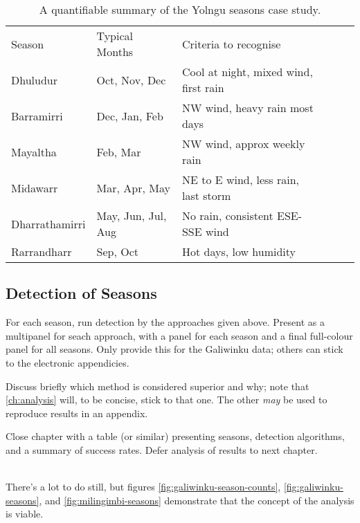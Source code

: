 \begin{table}[h]
    \centering
    \begin{tabular}{llllll}
        Season          &  Typical Months       &  Criteria to recognise                    \\
        Dhuludur        &  Oct, Nov, Dec        &  Cool at night, mixed wind, first rain    \\
        Barramirri      &  Dec, Jan, Feb        &  NW wind, heavy rain most days            \\
        Mayaltha        &  Feb, Mar             &  NW wind, approx weekly rain              \\
        Midawarr        &  Mar, Apr, May        &  NE to E wind, less rain, last storm      \\
        Dharrathamirri  &  May, Jun, Jul, Aug   &  No rain, consistent ESE-SSE wind         \\
        Rarrandharr     &  Sep, Oct             &  Hot days, low humidity                   
    \end{tabular}
    \caption[A quantifiable summary of the Yolngu seasons case study]{
        A quantifiable summary of the Yolngu seasons case study.}
    \label{tab:quant-seasons-summary}
\end{table}




\subsection{Detection of Seasons}
\label{subsec:results-season-detection}
For each season, run detection by the approaches given above.
Present as a multipanel for seach approach, with a panel for each season
and a final full-colour panel for all seasons.  Only provide this for the
Galiwinku data; others can stick to the electronic appendicies.

Discuss briefly which method is considered superior and why; note
that \autoref{ch:analysis} will, to be concise, stick to that one.
The other \emph{may} be used to reproduce results in an appendix.

Close chapter with a table (or similar) presenting seasons, detection
algorithms, and a summary of success rates.  Defer analysis of results
to next chapter.

~\\

There's a lot to do still, but figures \ref{fig:galiwinku-season-counts},
\ref{fig:galiwinku-seasons}, and \ref{fig:milingimbi-seasons}
demonstrate that the concept of the analysis is viable.

